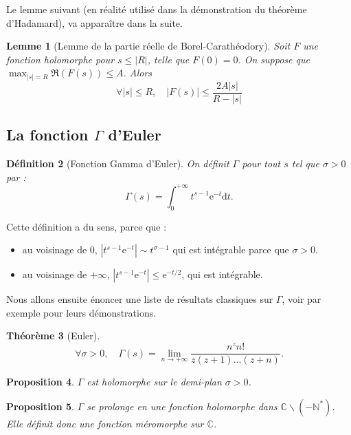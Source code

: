 \documentclass[french]{report}
\newtheorem{theorem}{Théorème}[section]
\newtheorem{definition}[theorem]{Définition}
\newtheorem{proposition}[theorem]{Proposition}
\newtheorem{lemma}[theorem]{Lemme}
\begin{document}
Le lemme suivant (en réalité utilisé dans la démonstration du théorème d'Hadamard), va apparaître dans la suite.

\begin{lemma}[Lemme de la partie réelle de Borel-Carathéodory]\label{lem:borel-caratheodory}
  Soit $F$ une fonction holomorphe pour $s\leq|R|$, telle que $F(0)=0$. On suppose que $\max_{|s|=R}\Re(F(s))\leq A$. Alors
  \[
    \forall |s|\leq R,\quad|F(s)|\leq\frac{2A|s|}{R-|s|}  
  \]
\end{lemma}

\subsection{La fonction $\Gamma$ d'Euler}

\begin{definition}[Fonction Gamma d'Euler]
  On définit $\Gamma$ pour tout $s$ tel que $\sigma>0$ par :
  \[
    \Gamma(s)=\int_0^{+\infty}t^{s-1}\mathrm{e}^{-t}\mathrm{d}t.
  \]
\end{definition}

Cette définition a du sens, parce que :
\begin{itemize}
  \item au voisinage de 0, $|t^{s-1}\mathrm{e}^{-t}|\sim t^{\sigma-1}$ qui est intégrable parce que $\sigma>0$.
  \item au voisinage de $+\infty$, $|t^{s-1}\mathrm{e}^{-t}|\leq \mathrm{e}^{-t/2}$, qui est intégrable.
\end{itemize}

Nous allons ensuite énoncer une liste de résultats classiques sur $\Gamma$, voir par exemple \cite{tenenbaum} pour leurs démonstrations.

\begin{theorem}[Euler]
  \[
    \forall \sigma>0,\quad
    \Gamma(s)=\lim_{n\to+\infty}\frac{n^zn!}{z(z+1)...(z+n)}.  
  \]
\end{theorem}

\begin{proposition}
  $\Gamma$ est holomorphe sur le demi-plan $\sigma>0$.
\end{proposition}

\begin{proposition}
  $\Gamma$ se prolonge en une fonction holomorphe dans $\mathbb{C}\backslash(-\mathbb{N}^*)$. Elle définit donc une fonction méromorphe sur $\mathbb{C}$.
\end{proposition}
\end{document}
